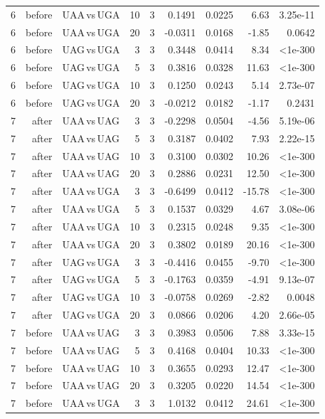 \begin{longtable}{rrlrlrrrr}
6 & before & UAA$\,$vs$\,$UGA & 10 & 3 & 0.1491 & 0.0225 & 6.63 & 3.25e-11 \\
6 & before & UAA$\,$vs$\,$UGA & 20 & 3 & -0.0311 & 0.0168 & -1.85 & 0.0642 \\
6 & before & UAG$\,$vs$\,$UGA & 3 & 3 & 0.3448 & 0.0414 & 8.34 & <1e-300 \\
6 & before & UAG$\,$vs$\,$UGA & 5 & 3 & 0.3816 & 0.0328 & 11.63 & <1e-300 \\
6 & before & UAG$\,$vs$\,$UGA & 10 & 3 & 0.1250 & 0.0243 & 5.14 & 2.73e-07 \\
6 & before & UAG$\,$vs$\,$UGA & 20 & 3 & -0.0212 & 0.0182 & -1.17 & 0.2431 \\
7 & after & UAA$\,$vs$\,$UAG & 3 & 3 & -0.2298 & 0.0504 & -4.56 & 5.19e-06 \\
7 & after & UAA$\,$vs$\,$UAG & 5 & 3 & 0.3187 & 0.0402 & 7.93 & 2.22e-15 \\
7 & after & UAA$\,$vs$\,$UAG & 10 & 3 & 0.3100 & 0.0302 & 10.26 & <1e-300 \\
7 & after & UAA$\,$vs$\,$UAG & 20 & 3 & 0.2886 & 0.0231 & 12.50 & <1e-300 \\
7 & after & UAA$\,$vs$\,$UGA & 3 & 3 & -0.6499 & 0.0412 & -15.78 & <1e-300 \\
7 & after & UAA$\,$vs$\,$UGA & 5 & 3 & 0.1537 & 0.0329 & 4.67 & 3.08e-06 \\
7 & after & UAA$\,$vs$\,$UGA & 10 & 3 & 0.2315 & 0.0248 & 9.35 & <1e-300 \\
7 & after & UAA$\,$vs$\,$UGA & 20 & 3 & 0.3802 & 0.0189 & 20.16 & <1e-300 \\
7 & after & UAG$\,$vs$\,$UGA & 3 & 3 & -0.4416 & 0.0455 & -9.70 & <1e-300 \\
7 & after & UAG$\,$vs$\,$UGA & 5 & 3 & -0.1763 & 0.0359 & -4.91 & 9.13e-07 \\
7 & after & UAG$\,$vs$\,$UGA & 10 & 3 & -0.0758 & 0.0269 & -2.82 & 0.0048 \\
7 & after & UAG$\,$vs$\,$UGA & 20 & 3 & 0.0866 & 0.0206 & 4.20 & 2.66e-05 \\
7 & before & UAA$\,$vs$\,$UAG & 3 & 3 & 0.3983 & 0.0506 & 7.88 & 3.33e-15 \\
7 & before & UAA$\,$vs$\,$UAG & 5 & 3 & 0.4168 & 0.0404 & 10.33 & <1e-300 \\
7 & before & UAA$\,$vs$\,$UAG & 10 & 3 & 0.3655 & 0.0293 & 12.47 & <1e-300 \\
7 & before & UAA$\,$vs$\,$UAG & 20 & 3 & 0.3205 & 0.0220 & 14.54 & <1e-300 \\
7 & before & UAA$\,$vs$\,$UGA & 3 & 3 & 1.0132 & 0.0412 & 24.61 & <1e-300 \\

\end{longtable}
